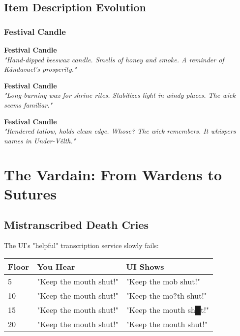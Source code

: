 \documentclass[11pt,a4paper,twoside]{book}
\begin{document}
\section{Item Description Evolution}

\subsection{Festival Candle}

\begin{tcolorbox}[width=\textwidth, colback=dawn!5, colframe=candlelight, title={\displayfont Early Game}]
\textbf{Festival Candle}\\
\textit{"Hand-dipped beeswax candle. Smells of honey and smoke. A reminder of Kándavael's prosperity."}
\end{tcolorbox}

\begin{tcolorbox}[width=\textwidth, colback=dusk!10, colframe=dusk, title={\displayfont Mid Game}]
\textbf{Festival Candle}\\
\textit{"Long-burning wax for shrine rites. Stabilizes light in windy places. The wick seems familiar."}
\end{tcolorbox}

\begin{tcolorbox}[width=\textwidth, colback=void!20, colframe=blood, title={\runefont Late Game}]
\textbf{Festival Candle}\\
\textit{"Rendered tallow, holds clean edge. Whose? The wick remembers. It whispers names in Under-Vêlth."}
\end{tcolorbox}

\chapter{The Vardain: From Wardens to Sutures}

\section{Mistranscribed Death Cries}

The UI's "helpful" transcription service slowly fails:

\begin{center}
\begin{tabular}{|l|l|l|}
\hline
\textbf{Floor} & \textbf{You Hear} & \textbf{UI Shows} \\
\hline
5 & "Keep the mouth shut!" & "Keep the mob shut!" \\
10 & "Keep the mouth shut!" & "Keep the mo?th shut!" \\
15 & "Keep the mouth shut!" & "Keep the mouth sh█t!" \\
20 & "Keep the mouth shut!" & "Keep the mouth shut!" \\
\hline
\end{tabular}
\end{center}
\end{document}
